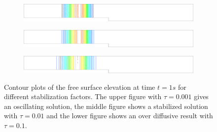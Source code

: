\documentclass[a4paper,12pt]{article}
\begin{document}
\begin{figure}[H]
\begin{subfigure}{\textwidth}
    \includegraphics[width=\textwidth]{img/step/stab_0.001_time_1.pdf}
\end{subfigure}
\par\medskip
\begin{subfigure}{\textwidth}
    \includegraphics[width=\textwidth]{img/step/stab_0.01_time_1.pdf}
\end{subfigure}
\par\medskip
\begin{subfigure}{\textwidth}
    \includegraphics[width=\textwidth]{img/step/stab_0.1_time_1.pdf}
\end{subfigure}
\caption{Contour plots of the free surface elevation at time $t=1s$ for different stabilization factors. The upper figure with $\tau=0.001$ gives an oscillating solution, the middle figure shows a stabilized solution with $\tau=0.01$ and the lower figure shows an over diffusive result with $\tau=0.1$.}
\label{stab_parameters_time1}
\end{figure}
\end{document}
